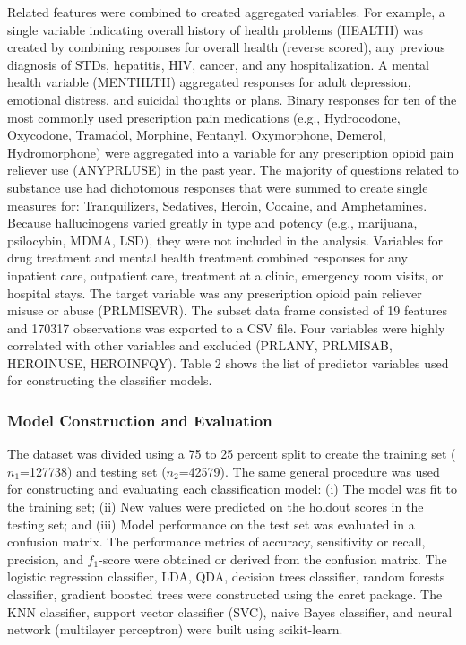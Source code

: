 \documentclass[sigconf]{acmart}
\begin{document}
Related features were combined to created aggregated variables. For example, 
a single variable indicating overall history of health problems (HEALTH) 
was created by combining responses for overall health (reverse scored), any
previous diagnosis of STDs, hepatitis, HIV, cancer, and any hospitalization. 
A mental health variable (MENTHLTH) aggregated responses for adult depression, 
emotional distress, and suicidal thoughts or plans. Binary responses for ten 
of the most commonly used prescription pain medications (e.g., Hydrocodone, 
Oxycodone, Tramadol, Morphine, Fentanyl, Oxymorphone, Demerol, Hydromorphone) 
were aggregated into a variable for any prescription opioid pain reliever use 
(ANYPRLUSE) in the past year. The majority of questions related to substance 
use had dichotomous responses that were summed to create single measures for: 
Tranquilizers, Sedatives, Heroin, Cocaine, and Amphetamines. Because 
hallucinogens varied greatly in type and potency (e.g., marijuana, psilocybin, 
MDMA, LSD), they were not included in the analysis. Variables for drug 
treatment and mental health treatment combined responses for any inpatient 
care, outpatient care, treatment at a clinic, emergency room visits, or 
hospital stays. The target variable was any prescription opioid pain reliever 
misuse or abuse (PRLMISEVR). The subset data frame consisted of 19 features 
and 170317 observations was exported to a CSV file. Four variables were highly 
correlated with other variables and excluded (PRLANY, PRLMISAB, HEROINUSE, 
HEROINFQY). Table 2 shows the list of predictor variables used for 
constructing the classifier models. 


\subsubsection{Model Construction and Evaluation}

The dataset was divided using a 75 to 25 percent split to create the training
set ($n_1$=127738) and testing set ($n_2$=42579). The same general procedure 
was used for constructing and evaluating each classification model: (i) The 
model was fit to the training set; (ii) New values were predicted on the 
holdout scores in the testing set; and (iii) Model performance on the test 
set was evaluated in a confusion matrix. The performance metrics of accuracy, 
sensitivity or recall, precision, and $f_1$-score were obtained or derived 
from the confusion matrix. The logistic regression classifier, LDA, QDA, 
decision trees classifier, random forests classifier, gradient boosted trees 
were constructed using the caret package. The KNN classifier, support 
vector classifier (SVC), naive Bayes classifier, and neural network 
(multilayer perceptron) were built using scikit-learn. 
\end{document}
